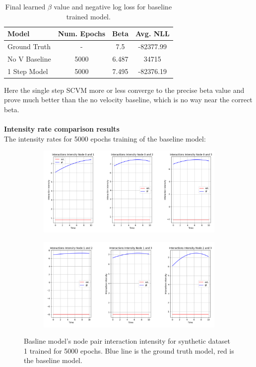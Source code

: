 \begin{table}[H]
\centering
\begin{tabular}{|l|c|cc|}
\hline
Model         & \multicolumn{1}{l|}{Num. Epochs} & Beta & Avg. NLL \\ \hline
Ground Truth  & -                                & 7.5  & -82377.99  \\
No V Baseline & 5000                             & 6.487  & 34715        \\
1 Step Model  & 5000                             & 7.495   & -82376.19      \\ \hline
\end{tabular}
\caption{Final learned $\beta$ value and negative log loss for baseline trained model.}
\label{tab:SingleStep1}
\end{table}
Here the single step SCVM more or less converge to the precise beta value and prove much better than the no velocity baseline, which is no way near the correct beta.
\\\\
\noindent
\textbf{Intensity rate comparison results}
\\
The intensity rates for 5000 epochs training of the baseline model:
\begin{figure}[H]
    \centering
    \begin{subfigure}[b]{\textwidth}
        \centering
        \includegraphics[width=\textwidth]{0_images/rq1_baseline_intensity_plot1.png}
    \end{subfigure}
    \vfill
    \begin{subfigure}[b]{\textwidth}
        \centering
        \includegraphics[width=\textwidth]{0_images/rq1_baseline_intensity_plot2.png}
    \end{subfigure}
    \caption{Basline model's node pair interaction intensity for synthetic dataset 1 trained for 5000 epochs. Blue line is the ground truth model, red is the baseline model.}
    \label{fig:RQ1:baseline_intensity}
\end{figure}
